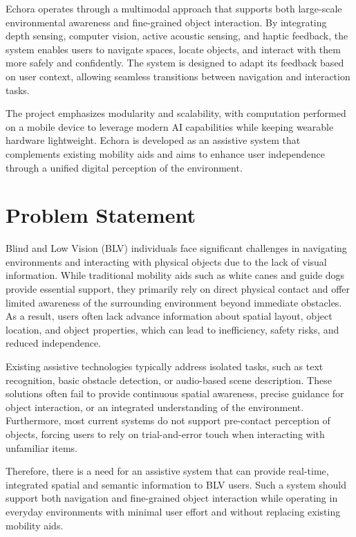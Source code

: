 Echora operates through a multimodal approach that supports both large-scale environmental awareness and fine-grained object interaction. By integrating depth sensing, computer vision, active acoustic sensing, and haptic feedback, the system enables users to navigate spaces, locate objects, and interact with them more safely and confidently. The system is designed to adapt its feedback based on user context, allowing seamless transitions between navigation and interaction tasks.

The project emphasizes modularity and scalability, with computation performed on a mobile device to leverage modern AI capabilities while keeping wearable hardware lightweight. Echora is developed as an assistive system that complements existing mobility aids and aims to enhance user independence through a unified digital perception of the environment.

\section{Problem Statement}

Blind and Low Vision (BLV) individuals face significant challenges in navigating environments and interacting with physical objects due to the lack of visual information. While traditional mobility aids such as white canes and guide dogs provide essential support, they primarily rely on direct physical contact and offer limited awareness of the surrounding environment beyond immediate obstacles. As a result, users often lack advance information about spatial layout, object location, and object properties, which can lead to inefficiency, safety risks, and reduced independence.

Existing assistive technologies typically address isolated tasks, such as text recognition, basic obstacle detection, or audio-based scene description. These solutions often fail to provide continuous spatial awareness, precise guidance for object interaction, or an integrated understanding of the environment. Furthermore, most current systems do not support pre-contact perception of objects, forcing users to rely on trial-and-error touch when interacting with unfamiliar items.

Therefore, there is a need for an assistive system that can provide real-time, integrated spatial and semantic information to BLV users. Such a system should support both navigation and fine-grained object interaction while operating in everyday environments with minimal user effort and without replacing existing mobility aids.

